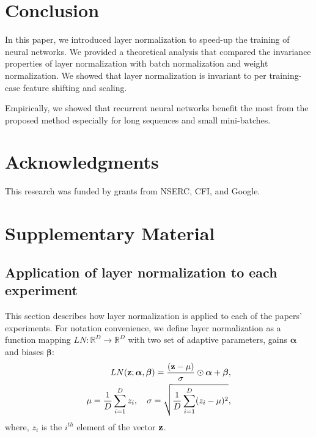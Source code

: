 \documentclass{article}
\newcommand{\real}{\mathbb{R}}
\begin{document}
\section{Conclusion}
\label{sec:discussion}

In this paper, we introduced layer normalization to speed-up the  training of neural networks. We provided a theoretical analysis that compared the invariance properties of layer normalization with batch normalization and weight normalization. We showed that layer normalization is invariant to per training-case feature shifting and scaling.

Empirically, we showed that recurrent neural networks benefit the most from the proposed method especially for long sequences and small mini-batches. 


\section*{Acknowledgments}   
\vspace{-0.1in}
This research was funded by grants from NSERC, CFI, and Google.

\pagebreak
\setlength{\bibsep}{5pt plus 0.3ex}
\begin{small}
\vspace{-0.1in}

\end{small}

\newpage


\section*{Supplementary Material}

\subsection*{Application of layer normalization to each experiment}

This section describes how layer normalization is applied to each of the papers' experiments. For notation convenience, we define layer normalization as a function mapping $LN: \real^D \to \real^D$ with two set of adaptive parameters, gains $\bm{\alpha}$ and biases $\bm{\beta}$:
\begin{eqnarray}
LN({\bf z} ; \bm{\alpha}, \bm{\beta}) = \frac{({\bf z} - \mu)}{\sigma} \odot \bm{\alpha} + \bm{\beta}, \\
\mu = \frac{1}{D}\sum_{i=1}^D z_i, \quad \sigma = \sqrt{\frac{1}{D}\sum_{i=1}^D (z_i-\mu)^2}, 
\end{eqnarray}
where, $z_i$ is the $i^{th}$ element of the vector ${\bf z}$.
\end{document}

